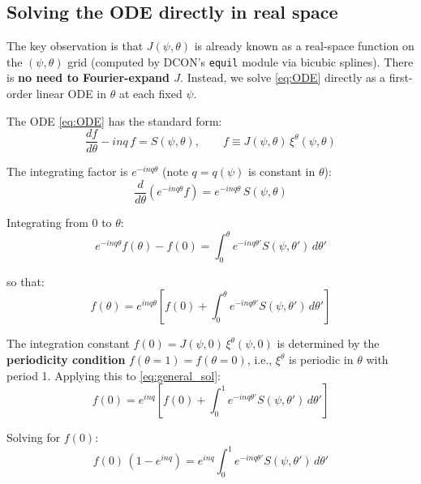 \documentclass[12pt,a4paper]{article}
\begin{document}
\subsection{Solving the ODE directly in real space}

The key observation is that $J(\psi,\theta)$ is already known as a real-space function on the $(\psi,\theta)$ grid (computed by DCON's \texttt{equil} module via bicubic splines). There is \textbf{no need to Fourier-expand $J$}. Instead, we solve \eqref{eq:ODE} directly as a first-order linear ODE in $\theta$ at each fixed $\psi$.

The ODE \eqref{eq:ODE} has the standard form:
\begin{equation}
    \frac{d f}{d\theta} - inq\, f = S(\psi,\theta), \qquad f \equiv J(\psi,\theta)\,\xi^\theta(\psi,\theta)
    \label{eq:ODE_f}
\end{equation}

The integrating factor is $e^{-inq\theta}$ (note $q = q(\psi)$ is constant in $\theta$):
\begin{equation}
    \frac{d}{d\theta}\!\left(e^{-inq\theta} f\right) = e^{-inq\theta}\,S(\psi,\theta)
\end{equation}

Integrating from $0$ to $\theta$:
\begin{equation}
    e^{-inq\theta} f(\theta) - f(0) = \int_0^\theta e^{-inq\theta'} S(\psi,\theta')\,d\theta'
\end{equation}

so that:
\begin{equation}
    f(\theta) = e^{inq\theta}\left[f(0) + \int_0^\theta e^{-inq\theta'} S(\psi,\theta')\,d\theta'\right]
    \label{eq:general_sol}
\end{equation}

The integration constant $f(0) = J(\psi,0)\,\xi^\theta(\psi,0)$ is determined by the \textbf{periodicity condition} $f(\theta{=}1) = f(\theta{=}0)$, i.e., $\xi^\theta$ is periodic in $\theta$ with period 1. Applying this to \eqref{eq:general_sol}:
\begin{equation}
    f(0) = e^{inq}\left[f(0) + \int_0^1 e^{-inq\theta'} S(\psi,\theta')\,d\theta'\right]
\end{equation}

Solving for $f(0)$:
\begin{equation}
    f(0)\,(1 - e^{inq}) = e^{inq}\int_0^1 e^{-inq\theta'} S(\psi,\theta')\,d\theta'
\end{equation}
\end{document}
